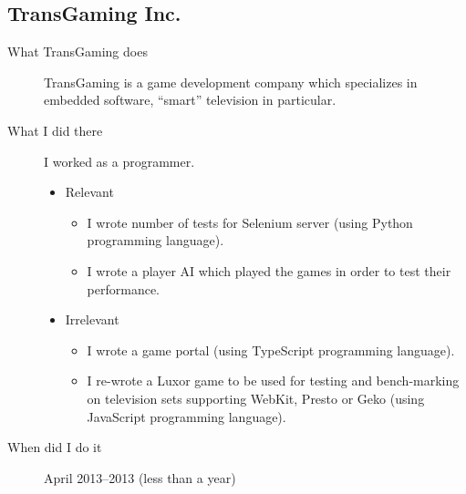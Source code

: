 \documentclass[11pt]{article}
\begin{document}
\subsection{TransGaming Inc.}
\label{sec:orgheadline3}
\begin{description}
\item[{What TransGaming does}] TransGaming is a game development company which
specializes in embedded software, ``smart'' television in particular.
\item[{What I did there}] I worked as a programmer.
\begin{itemize}
\item Relevant
\begin{itemize}
\item I wrote number of tests for Selenium server (using Python programming
language).
\item I wrote a player AI which played the games in order to test their
performance.
\end{itemize}
\item Irrelevant
\begin{itemize}
\item I wrote a game portal (using TypeScript programming language).
\item I re-wrote a Luxor game to be used for testing and bench-marking
on television sets supporting WebKit, Presto or Geko (using JavaScript
programming language).
\end{itemize}
\end{itemize}

\item[{When did I do it}] April 2013--2013 (less than a year)
\end{description}
\end{document}
